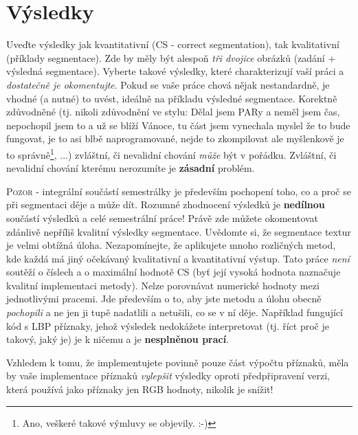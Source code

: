 \documentclass[a4paper,10pt,twocolumn]{article}
\begin{document}
%
\section{Výsledky}

Uveďte výsledky jak kvantitativní (CS - correct segmentation), tak kvalitativní (příklady segmentace). Zde by měly být alespoň \emph{tři dvojice} obrázků (zadání + výsledná segmentace). Vyberte takové výsledky, které charakterizují vaší práci a \emph{dostatečně je okomentujte}. Pokud se vaše práce chová nějak nestandardně, je vhodné (a nutné) to uvést, ideálně na příkladu výsledné segmentace. Korektně zdůvodněné (tj. nikoli zdůvodnění ve stylu: Dělal jsem PARy a neměl jsem čas, nepochopil jsem to a už se blíží Vánoce, tu část jsem vynechala myslel že to bude fungovat, je to asi blbě naprogramované, nejde to zkompilovat ale myšlenkově je to správně\footnote{Ano, veškeré takové výmluvy se objevily. :-)}, ...) zvláštní, či nevalidní chování \emph{může} být v pořádku. Zvláštní, či nevalidní chování kterému nerozumíte je \textbf{zásadní} problém. 

\textsc{Pozor} - integrální součástí semestrálky je především pochopení toho, co a proč se při segmentaci děje a může dít. Rozumné zhodnocení výsledků je \textbf{nedílnou} součástí výsledků a celé semestrální práce! Právě zde můžete okomentovat zdánlivě nepříliš kvalitní výsledky segmentace. Uvědomte si, že segmentace textur je velmi obtížná úloha. Nezapomínejte, že aplikujete mnoho rozličných metod, kde každá má jiný očekávaný kvalitativní a kvantitativní výstup. Tato práce \emph{není} soutěží o číslech a o maximální hodnotě CS (byť její vysoká hodnota naznačuje kvalitní implementaci metody). Nelze porovnávat numerické hodnoty mezi jednotlivými pracemi. Jde především o to, aby jste metodu a úlohu obecně \emph{pochopili} a ne jen ji tupě nadatlili a netušili, co se v ní děje. Například fungující kód s LBP příznaky, jehož výsledek nedokážete interpretovat (tj. říct proč je takový, jaký je) je k ničemu a je \textbf{nesplněnou prací}. 

Vzhledem k tomu, že implementujete povinně pouze část výpočtu příznaků, měla by vaše implementace příznaků \emph{vylepšit} výsledky oproti předpřipravení verzi, která používá jako příznaky jen RGB hodnoty, nikolik je snížit!
\end{document}

